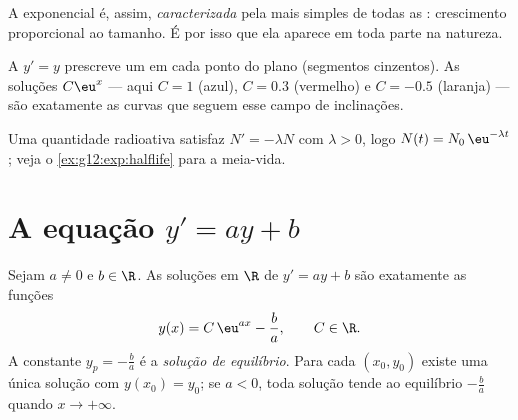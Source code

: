 \begin{remark}
A exponencial é, assim, \emph{caracterizada} pela mais simples de todas as
: crescimento proporcional ao tamanho. É por isso que
ela aparece em toda parte na natureza.
\end{remark}

\begin{omfigure}

{\small A  $y' = y$ prescreve um  em cada ponto
do plano (segmentos cinzentos). As soluções $C\eu^{x}$ --- aqui $C = 1$
(azul), $C = 0.3$ (vermelho) e $C = -0.5$ (laranja) --- são exatamente as
curvas que seguem esse campo de inclinações.}
\end{omfigure}

\begin{example}\label{ex:g12:diffeq:decay}
Uma quantidade radioativa satisfaz $N' = -\lambda N$ com $\lambda > 0$,
logo $N(t) = N_0\,\eu^{-\lambda t}$; veja o
\cref{ex:g12:exp:halflife} para a meia-vida.
\end{example}

\section{A equação \texorpdfstring{$y' = ay + b$}{y' = ay + b}}

\begin{theorem}[Soluções de $y' = ay + b$]\label{thm:g12:diffeq:affine}
Sejam $a \neq 0$ e $b \in \R$. As soluções em $\R$ de $y' = ay + b$ são
exatamente as funções
\[
y(x) = C\,\eu^{ax} - \frac{b}{a}, \qquad C \in \R .
\]
A  constante $y_p = -\frac ba$ é a \emph{solução de equilíbrio}. Para
cada $(x_0, y_0)$ existe uma única solução com $y(x_0) = y_0$; se $a < 0$,
toda solução tende ao equilíbrio $-\frac ba$ quando $x \to +\infty$.
\end{theorem}


